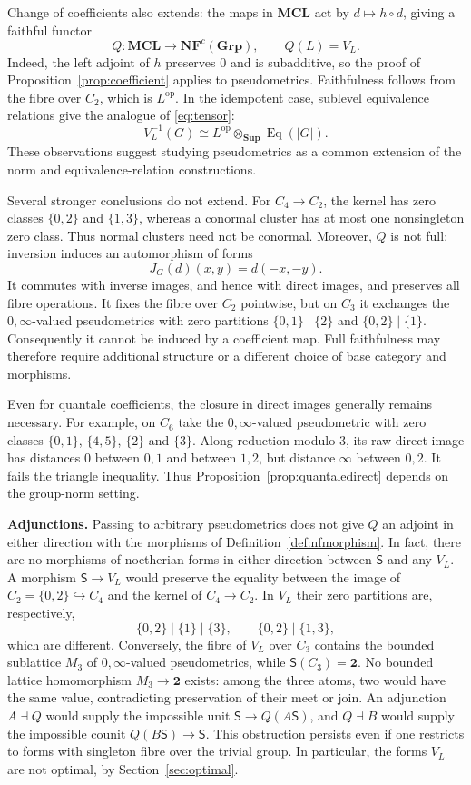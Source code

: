 \documentclass[12pt,a4paper]{amsart}
\theoremstyle{definition}
\newcommand{\Grp}{\mathbf{Grp}}
\newcommand{\op}{\mathrm{op}}
\newcommand{\two}{\mathbf{2}}
\newcommand{\NF}{\mathbf{NF}}
\newcommand{\MCL}{\mathbf{MCL}}
\newcommand{\Sup}{\mathbf{Sup}}
\begin{document}
Change of coefficients also extends: the maps in $\MCL$ act by $d\mapsto h\circ d$, giving a faithful functor
\[
 Q:\MCL\longrightarrow\NF^c(\Grp),\qquad Q(L)=V_L.
\]
Indeed, the left adjoint of $h$ preserves $0$ and is subadditive, so the proof of Proposition~\ref{prop:coefficient} applies to pseudometrics. Faithfulness follows from the fibre over $C_2$, which is $L^{\op}$. In the idempotent case, sublevel equivalence relations give the analogue of \eqref{eq:tensor}:
\[
 V_L^{-1}(G)\cong L^{\op}\otimes_{\Sup}\operatorname{Eq}(|G|).
\]
These observations suggest studying pseudometrics as a common extension of the norm and equivalence-relation constructions.

Several stronger conclusions do not extend. For $C_4\to C_2$, the kernel has zero classes $\{0,2\}$ and $\{1,3\}$, whereas a conormal cluster has at most one nonsingleton zero class. Thus normal clusters need not be conormal. Moreover, $Q$ is not full: inversion induces an automorphism of forms
\[
 J_G(d)(x,y)=d(-x,-y).
\]
It commutes with inverse images, and hence with direct images, and preserves all fibre operations. It fixes the fibre over $C_2$ pointwise, but on $C_3$ it exchanges the $0,\infty$-valued pseudometrics with zero partitions $\{0,1\}\mid\{2\}$ and $\{0,2\}\mid\{1\}$. Consequently it cannot be induced by a coefficient map. Full faithfulness may therefore require additional structure or a different choice of base category and morphisms.

Even for quantale coefficients, the closure in direct images generally remains necessary. For example, on $C_6$ take the $0,\infty$-valued pseudometric with zero classes $\{0,1\}$, $\{4,5\}$, $\{2\}$ and $\{3\}$. Along reduction modulo $3$, its raw direct image has distances $0$ between $0,1$ and between $1,2$, but distance $\infty$ between $0,2$. It fails the triangle inequality. Thus Proposition~\ref{prop:quantaledirect} depends on the group-norm setting.

\medskip
\noindent\textbf{Adjunctions.}
Passing to arbitrary pseudometrics does not give $Q$ an adjoint in either direction with the morphisms of Definition~\ref{def:nfmorphism}. In fact, there are no morphisms of noetherian forms in either direction between $\mathsf S$ and any $V_L$. A morphism $\mathsf S\to V_L$ would preserve the equality between the image of $C_2=\{0,2\}\hookrightarrow C_4$ and the kernel of $C_4\to C_2$. In $V_L$ their zero partitions are, respectively,
\[
 \{0,2\}\mid\{1\}\mid\{3\},\qquad
 \{0,2\}\mid\{1,3\},
\]
which are different. Conversely, the fibre of $V_L$ over $C_3$ contains the bounded sublattice $M_3$ of $0,\infty$-valued pseudometrics, while $\mathsf S(C_3)=\two$. No bounded lattice homomorphism $M_3\to\two$ exists: among the three atoms, two would have the same value, contradicting preservation of their meet or join. An adjunction $A\dashv Q$ would supply the impossible unit $\mathsf S\to Q(A\mathsf S)$, and $Q\dashv B$ would supply the impossible counit $Q(B\mathsf S)\to\mathsf S$. This obstruction persists even if one restricts to forms with singleton fibre over the trivial group. In particular, the forms $V_L$ are not optimal, by Section~\ref{sec:optimal}.
\end{document}
